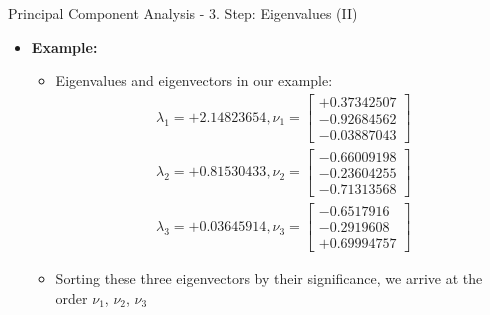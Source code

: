 \begin{frame}{Principal Component Analysis - 3. Step: Eigenvalues (II)}
	\begin{itemize}
		\item \textbf{Example:}
		      \begin{itemize}
			      \item Eigenvalues and eigenvectors in our example: \\
			            \begin{align*}
				            \lambda_1 = +2.14823654,
				            \nu_1 = \begin{bmatrix} +0.37342507 \\ -0.92684562 \\ -0.03887043 \end{bmatrix}
				            \\
				            \lambda_2 = +0.81530433,
				            \nu_2 = \begin{bmatrix} -0.66009198 \\ -0.23604255 \\ -0.71313568 \end{bmatrix}
				            \\
				            \lambda_3 = +0.03645914,
				            \nu_3 = \begin{bmatrix} -0.6517916 \\ -0.2919608 \\ +0.69994757 \end{bmatrix}
			            \end{align*}
			      \item Sorting these three eigenvectors by their significance, we
			            arrive at the order $\nu_1$, $\nu_2$, $\nu_3$
		      \end{itemize}
	\end{itemize}
\end{frame}

